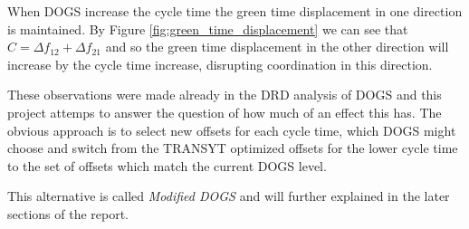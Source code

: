When DOGS increase the cycle time the green time displacement in one direction is maintained. By Figure \ref{fig:green_time_displacement} we can see that $C = \Delta f_{12} + \Delta f_{21}$ and so the green time displacement in the other direction will increase by the cycle time increase, disrupting coordination in this direction.

These observations were made already in the DRD analysis of DOGS \cite{dogs} and this project attemps to answer the question of how much of an effect this has. The obvious approach is to select new offsets for each cycle time, which DOGS might choose and switch from the TRANSYT optimized offsets for the lower cycle time to the set of offsets which match the current DOGS level.

This alternative is called \textit{Modified DOGS} and will further explained in the later sections of the report.